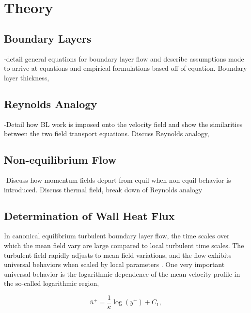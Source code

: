 \chapter{Theory}

\section{Boundary Layers}
-detail general equations for boundary layer flow and describe assumptions made to arrive at equations and empirical formulations based off of equation.
Boundary layer thickness, \\

\section{Reynolds Analogy}
-Detail how BL work is imposed onto the velocity field and show the similarities between the two field transport equations.
Discuss Reynolds analogy, \\

\section{Non-equilibrium Flow}
-Discuss how momentum fields depart from equil when non-equil behavior is introduced.
Discuss thermal field, break down of Reynolds analogy\\

\section{Determination of Wall Heat Flux}



In canonical equilibrium turbulent boundary layer flow, the time scales over which the mean field vary are large compared to local turbulent time scales. The turbulent field rapidly adjusts to mean field variations, and the flow exhibits universal behaviors when scaled by local parameters \cite{townsend1976}. One very important universal behavior is the logarithmic dependence of the mean velocity profile in the so-called logarithmic region,

\begin{equation}
{\overline u^+}=\frac{1}{\kappa}\log(y^+)+C_1, \label{eq:lawofwall}
\end{equation}

